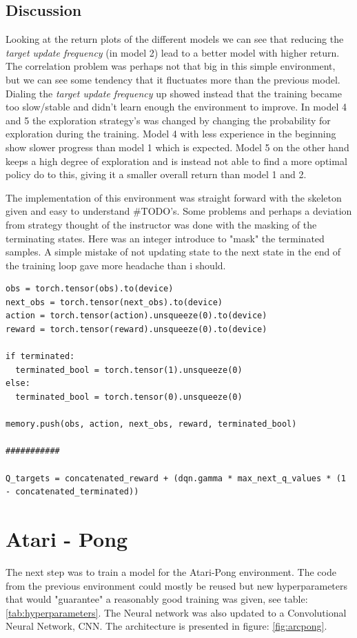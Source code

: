 \documentclass[a4paper,10pt]{article}
\begin{document}
\subsection*{Discussion}
Looking at the return plots of the different models we can see that reducing the \emph{target update frequency} (in model 2) lead to a better model with higher return. The correlation problem was perhaps not that big in this simple environment, but we can see some tendency that it fluctuates more than the previous model. Dialing the \emph{target update frequency} up showed instead that the training became too slow/stable and didn't learn enough the environment to improve. In model 4 and 5 the exploration strategy's was changed by changing the probability for exploration during the training. Model 4 with less experience in the beginning show slower progress than model 1 which is expected. Model 5 on the other hand keeps a high degree of exploration and is instead not able to find a more optimal policy do to this, giving it a smaller overall return than model 1 and 2.  

The implementation of this environment was straight forward with the skeleton given and easy to understand \#TODO's. Some problems and perhaps a deviation from strategy thought of the instructor was done with the masking of the terminating states. Here was an integer introduce to "mask" the terminated samples. A simple mistake of not updating state to the next state in the end of the training loop gave more headache than i should. 

\newpage 
\begin{lstlisting}
obs = torch.tensor(obs).to(device)
next_obs = torch.tensor(next_obs).to(device)
action = torch.tensor(action).unsqueeze(0).to(device)
reward = torch.tensor(reward).unsqueeze(0).to(device)

if terminated:
  terminated_bool = torch.tensor(1).unsqueeze(0)
else:
  terminated_bool = torch.tensor(0).unsqueeze(0)

memory.push(obs, action, next_obs, reward, terminated_bool)

###########

Q_targets = concatenated_reward + (dqn.gamma * max_next_q_values * (1 - concatenated_terminated))
\end{lstlisting}





\section{Atari - Pong}
The next step was to train a model for the Atari-Pong environment. The code from the previous environment could mostly be reused but new hyperparameters that would "guarantee" a reasonably good training was given, see table: \ref{tab:hyperparameters}. The Neural network was also updated to a Convolutional Neural Network, CNN. The architecture is presented in figure: \ref{fig:arcpong}.  
\end{document}
